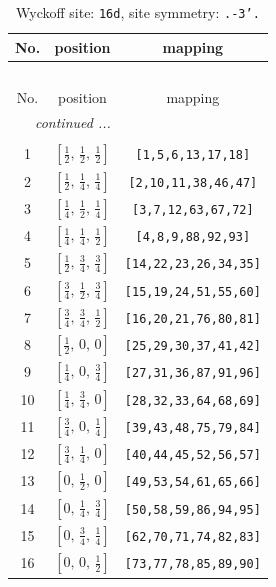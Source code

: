 \documentclass[fleqn,8pt]{jsarticle}
\begin{document}
\renewcommand{\arraystretch}{1.2}
\begin{longtable}{ccc}
\caption{Wyckoff site: {\tt 16d}, site symmetry: {\tt .-3'.}}
 \\
 \hline \hline
No. & position & mapping \\ \hline \endfirsthead

\multicolumn{2}{l}{\tablename\ \thetable{}} \\
 \hline \hline
No. & position & mapping \\ \hline \endhead

 \hline \hline
\multicolumn{2}{r}{\footnotesize\it continued ...} \\ \endfoot

 \hline \hline
\multicolumn{2}{r}{} \\ \endlastfoot

1 & $\left[ \frac{1}{2},\, \frac{1}{2},\, \frac{1}{2} \right]$ & {\tt [1,5,6,13,17,18]} \\ \hline
2 & $\left[ \frac{1}{2},\, \frac{1}{4},\, \frac{1}{4} \right]$ & {\tt [2,10,11,38,46,47]} \\ \hline
3 & $\left[ \frac{1}{4},\, \frac{1}{2},\, \frac{1}{4} \right]$ & {\tt [3,7,12,63,67,72]} \\ \hline
4 & $\left[ \frac{1}{4},\, \frac{1}{4},\, \frac{1}{2} \right]$ & {\tt [4,8,9,88,92,93]} \\ \hline
5 & $\left[ \frac{1}{2},\, \frac{3}{4},\, \frac{3}{4} \right]$ & {\tt [14,22,23,26,34,35]} \\ \hline
6 & $\left[ \frac{3}{4},\, \frac{1}{2},\, \frac{3}{4} \right]$ & {\tt [15,19,24,51,55,60]} \\ \hline
7 & $\left[ \frac{3}{4},\, \frac{3}{4},\, \frac{1}{2} \right]$ & {\tt [16,20,21,76,80,81]} \\ \hline
8 & $\left[ \frac{1}{2},\, 0,\, 0 \right]$ & {\tt [25,29,30,37,41,42]} \\ \hline
9 & $\left[ \frac{1}{4},\, 0,\, \frac{3}{4} \right]$ & {\tt [27,31,36,87,91,96]} \\ \hline
10 & $\left[ \frac{1}{4},\, \frac{3}{4},\, 0 \right]$ & {\tt [28,32,33,64,68,69]} \\ \hline
11 & $\left[ \frac{3}{4},\, 0,\, \frac{1}{4} \right]$ & {\tt [39,43,48,75,79,84]} \\ \hline
12 & $\left[ \frac{3}{4},\, \frac{1}{4},\, 0 \right]$ & {\tt [40,44,45,52,56,57]} \\ \hline
13 & $\left[ 0,\, \frac{1}{2},\, 0 \right]$ & {\tt [49,53,54,61,65,66]} \\ \hline
14 & $\left[ 0,\, \frac{1}{4},\, \frac{3}{4} \right]$ & {\tt [50,58,59,86,94,95]} \\ \hline
15 & $\left[ 0,\, \frac{3}{4},\, \frac{1}{4} \right]$ & {\tt [62,70,71,74,82,83]} \\ \hline
16 & $\left[ 0,\, 0,\, \frac{1}{2} \right]$ & {\tt [73,77,78,85,89,90]} \\
\end{longtable}
\end{document}
